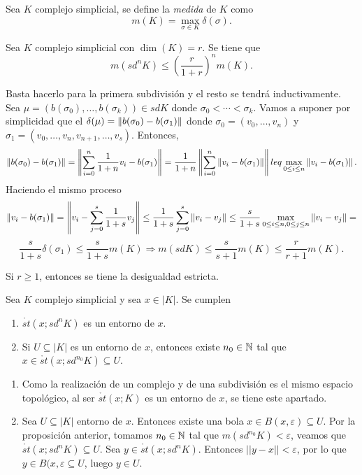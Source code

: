 \documentclass[HS.tex]{subfiles}
\begin{document}
\begin{defi}
Sea $K$ complejo simplicial, se define la \emph{medida} de $K$ como 
\[
m(K)=\max_{\sigma\in K}\delta(\sigma).
\]
\end{defi}

\begin{prop}
Sea $K$ complejo simplicial con $\dim(K)=r$. Se tiene que 
\[
m(sd^nK)\leq \left(\frac{r}{1+r}\right)^nm(K).
\]

\end{prop}
\begin{dem}
Basta hacerlo para la primera subdivisión y el resto se tendrá inductivamente. Sea $\mu=(b(\sigma_0),\dots, b(\sigma_k))\in sdK$ donde $\sigma_0<\cdots<\sigma_k$. Vamos a suponer por simplicidad que el $\delta(\mu)=\left\lVert b(\sigma_0)-b(\sigma_1)\right\rVert$ donde $\sigma_0=(v_0,\dots, v_n)$ y $\sigma_1=(v_0,\dots, v_n,v_{n+1},\dots, v_s)$. Entonces, 
\[
\left\lVert b(\sigma_0)-b(\sigma_1)\right\rVert=\left\lVert\sum_{i=0}^n\frac{1}{1+n}v_i-b(\sigma_1)\right\rVert=\frac{1}{1+n}\left\lVert\sum_{i=0}^n\left\lVert v_i-b(\sigma_1)\right\rVert\right\rVert leq \max_{0\leq i\leq n}\left\lVert v_i-b(\sigma_1)\right\rVert.
\]
Haciendo el mismo proceso 
\[
\left\lVert v_i-b(\sigma_1)\right\rVert=\left\lVert v_i-\sum_{j=0}^s\frac{1}{1+s}v_j\right\rVert\leq \frac{1}{1+s}\sum_{j=0}^s\left\lVert v_i-v_j\right\rVert\leq \frac{s}{1+s}\max_{0\leq i\leq n,0\leq j\leq n}\left\lVert v_i-v_j\right\rVert= 
\]
\[
\frac{s}{1+s}\delta(\sigma_1)\leq \frac{s}{1+s}m(K)\Rightarrow m(sdK)\leq \frac{s}{s+1}m(K)\leq \frac{r}{r+1}m(K).
\]
\QED
\end{dem}

\begin{nota}
Si $r\geq 1$, entonces se tiene la desigualdad estricta.
\end{nota}

\begin{prop}
Sea $K$ complejo simplicial y sea $x\in|K|$. Se cumplen
\begin{enumerate}
\item $\mathring{st}(x;sd^nK)$ es un entorno de $x$.
\item Si $U\subseteq|K|$ es un entorno de $x$, entonces existe $n_0\in\mathbb{N}$ tal que $x\in\mathring{st}(x;sd^{n_0}K)\subseteq U$. 
\end{enumerate}
\end{prop}
\begin{dem}
\begin{enumerate}
\item Como la realización de un complejo y de una subdivisión es el mismo espacio topológico, al ser $\mathring{st}(x;K)$ es un entorno de $x$, se tiene este apartado.
\item Sea $U\subseteq|K|$ entorno de $x$. Entonces existe una bola $x\in B(x,\varepsilon)\subseteq U$. Por la proposición anterior, tomamos $n_0\in\mathbb{N}$ tal que $m(sd^{n_0}K)<\varepsilon$, veamos que $\mathring{st}(x;sd^nK)\subseteq U$. Sea $y\in \mathring{st}(x;sd^nK)$. Entonces $||y-x||<\varepsilon$, por lo que $y\in B(x,\varepsilon\subseteq U$, luego $y\in U$.
\end{enumerate}
\QED
\end{dem}
\end{document}
